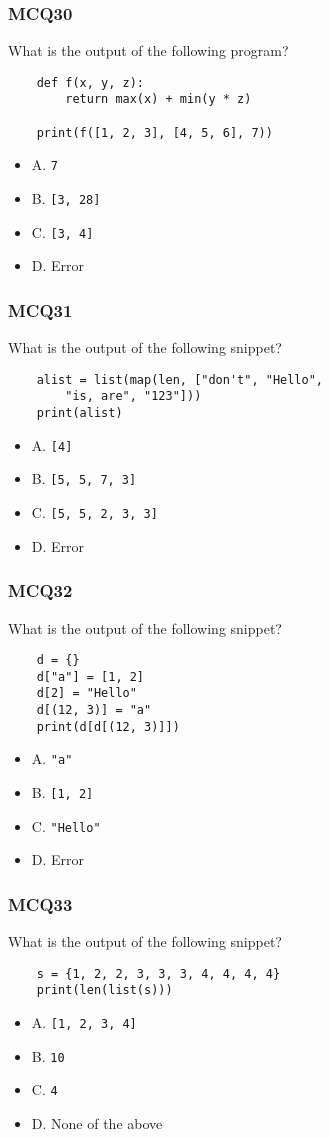 \documentclass{beamer}
\begin{document}
\begin{frame}[fragile]
    \frametitle{MCQ30}
    What is the output of the following program?
    \begin{verbatim}
    def f(x, y, z):
        return max(x) + min(y * z)

    print(f([1, 2, 3], [4, 5, 6], 7))
    \end{verbatim}
    \begin{itemize}
        \item A. \texttt{7}
        \item B. \texttt{[3, 28]}
        \item C. \texttt{[3, 4]}
        \item D. Error
    \end{itemize}
\end{frame}

\begin{frame}[fragile]
    \frametitle{MCQ31}
    What is the output of the following snippet?
    \begin{verbatim}
    alist = list(map(len, ["don't", "Hello",
        "is, are", "123"]))
    print(alist)
    \end{verbatim}
    \begin{itemize}
        \item A. \texttt{[4]}
        \item B. \texttt{[5, 5, 7, 3]}
        \item C. \texttt{[5, 5, 2, 3, 3]}
        \item D. Error
    \end{itemize}
\end{frame}

\begin{frame}[fragile]
    \frametitle{MCQ32}
    What is the output of the following snippet?
    \begin{verbatim}
    d = {}
    d["a"] = [1, 2]
    d[2] = "Hello"
    d[(12, 3)] = "a"
    print(d[d[(12, 3)]])
    \end{verbatim}
    \begin{itemize}
        \item A. \texttt{"a"}
        \item B. \texttt{[1, 2]}
        \item C. \texttt{"Hello"}
        \item D. Error
    \end{itemize}
\end{frame}

\begin{frame}[fragile]
    \frametitle{MCQ33}
    What is the output of the following snippet?
    \begin{verbatim}
    s = {1, 2, 2, 3, 3, 3, 4, 4, 4, 4}
    print(len(list(s)))
    \end{verbatim}
    \begin{itemize}
        \item A. \texttt{[1, 2, 3, 4]}
        \item B. \texttt{10}
        \item C. \texttt{4}
        \item D. None of the above
    \end{itemize}
\end{frame}
\end{document}
